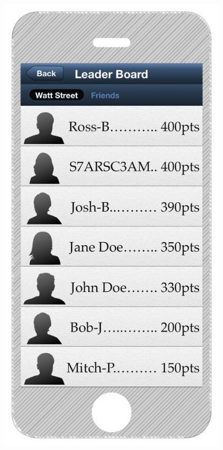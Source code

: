 \documentclass[a4paper,12pt]{article}
\begin{document}
\begin{figure}
\centering
\begin{minipage}{.5\textwidth}
  \centering
  \includegraphics[width=.6\linewidth]{./images/iphone-interface-leaderboard}
  \label{iphone-interface-leaderboard}
\end{minipage}%
\begin{minipage}{.5\textwidth}
  \centering

\end{minipage}
\end{figure}
\end{document}
